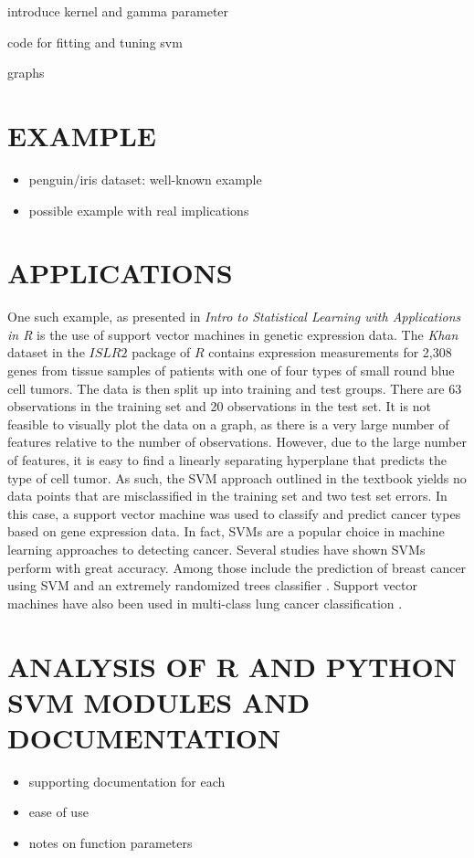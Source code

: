 \documentclass[12pt]{article}
\begin{document}
introduce kernel and gamma parameter

code for fitting and tuning svm

graphs

\section{EXAMPLE}
\begin{itemize}
    \item penguin/iris dataset: well-known example
    \item possible example with real implications
\end{itemize}

\section{APPLICATIONS}

One such example, as presented in \textit{Intro to Statistical Learning with Applications in R} \citep{introstatlearning} is the use of support vector machines in genetic expression data. The \textit{Khan} dataset in the $ISLR2$ package of $R$ contains expression measurements for 2,308 genes from tissue samples of patients with one of four types of small round blue cell tumors. The data is then split up into training and test groups. There are 63 observations in the training set and 20 observations in the test set. It is not feasible to visually plot the data on a graph, as there is a very large number of features relative to the number of observations. However, due to the large number of features, it is easy to find a linearly separating hyperplane that predicts the type of cell tumor. As such, the SVM approach outlined in the textbook yields no data points that are misclassified in the training set and two test set errors. In this case, a support vector machine was used to classify and predict cancer types based on gene expression data. In fact, SVMs are a popular choice in machine learning approaches to detecting cancer. Several studies have shown SVMs perform with great accuracy. Among those include the prediction of breast cancer using SVM and an extremely randomized trees classifier \cite{breastcancer}. Support vector machines have also been used in multi-class lung cancer classification \cite{lungcancer}.

\section{ANALYSIS OF R AND PYTHON SVM MODULES AND DOCUMENTATION}

\begin{itemize}
    \item supporting documentation for each
    \item ease of use
    \item notes on function parameters
\end{itemize}

\newpage
\thispagestyle{empty}


\end{document}
